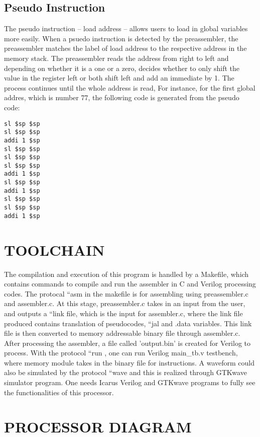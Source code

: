 \documentclass[11pt, titlepage]{article}
\begin{document}
\subsection{Pseudo Instruction}
The pseudo instruction -- load address -- allows users to load in global variables more easily. When a psuedo instruction is detected by the preassembler, the preassembler matches the label of load address to the respective address in the memory stack. The preassembler reads the address from right to left and depending on whether it is a one or a zero, decides whether to only shift the value in the register left or both shift left and add an immediate by 1. The process continues until the whole address is read, For instance, for the first global addres, which is number 77, the following code is generated from the pseudo code:

\begin{lstlisting}[language=Ant]
sl $sp $sp
sl $sp $sp
addi 1 $sp
sl $sp $sp
sl $sp $sp
sl $sp $sp
addi 1 $sp
sl $sp $sp
addi 1 $sp
sl $sp $sp
sl $sp $sp
addi 1 $sp
\end{lstlisting}
\newpage
\section{TOOLCHAIN}

The compilation and execution of this program is handled by a Makefile, which contains commands to compile and run the assembler in C and Verilog processing codes. The protocal ``asm in the makefile is for assembling using preassembler.c and assembler.c. At this stage, preassembler.c takes in an input from the user, and outputs a ``link file, which is the input for assembler.c, where the link file produced contains translation of pseudocodes, ``jal and .data variables. This link file is then converted to memory addressable binary file through assembler.c. After processing the assembler, a file called 'output.bin' is created for Verilog to process. With the protocol ``run , one can run Verilog main\_tb.v testbench, where memory module takes in the binary file for instructions. A waveform could also be simulated by the protocol ``wave and this is realized through GTKwave simulator program. One needs Icarus Verilog and GTKwave programs to fully see the functionalities of this processor.

\section{PROCESSOR DIAGRAM}
\end{document}
